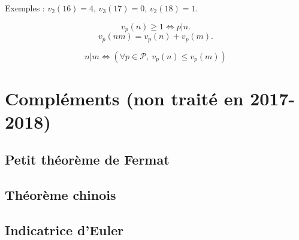 Exemples : $v_2(16)=4$, $v_3(17)=0$, $v_2(18)=1$.

\begin{proposition}
\[ v_p(n)\geq 1 \iff p|n.\]
\[ v_p(nm) = v_p(n)+v_p(m).\]
\end{proposition}

\begin{proposition}
\[ 
n|m \iff \left(\forall p\in \mathcal P, \: v_p(n)\leq v_p(m)\right)
\]
\end{proposition}

\section{Compléments (non traité en 2017-2018)}
\subsection{Petit théorème de Fermat}
\subsection{Théorème chinois}
\subsection{Indicatrice d'Euler}
